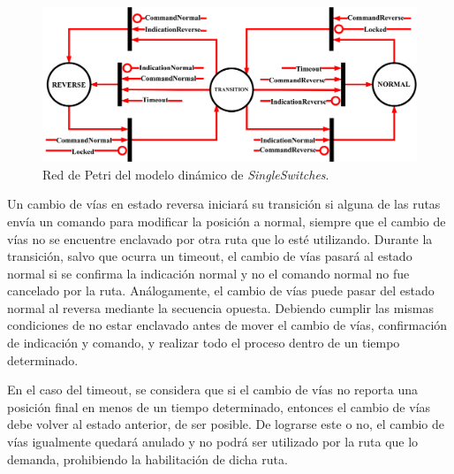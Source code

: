 \begin{figure}[H]
	\centering
	\includegraphics[width=1\textwidth]{Figuras/SSW_Petri}
	\centering\caption{Red de Petri del modelo dinámico de \textit{SingleSwitches}.}
	\label{fig:SSW_Petri}
\end{figure}

Un cambio de vías en estado reversa iniciará su transición si alguna de las rutas envía un comando para modificar la posición a normal, siempre que el cambio de vías no se encuentre enclavado por otra ruta que lo esté utilizando. Durante la transición, salvo que ocurra un timeout, el cambio de vías pasará al estado normal si se confirma la indicación normal y no el comando normal no fue cancelado por la ruta. Análogamente, el cambio de vías puede pasar del estado normal al reversa mediante la secuencia opuesta. Debiendo cumplir las mismas condiciones de no estar enclavado antes de mover el cambio de vías, confirmación de indicación y comando, y realizar todo el proceso dentro de un tiempo determinado.

En el caso del timeout, se considera que si el cambio de vías no reporta una posición final en menos de un tiempo determinado, entonces el cambio de vías debe volver al estado anterior, de ser posible. De lograrse este o no, el cambio de vías igualmente quedará anulado y no podrá ser utilizado por la ruta que lo demanda, prohibiendo la habilitación de dicha ruta.
